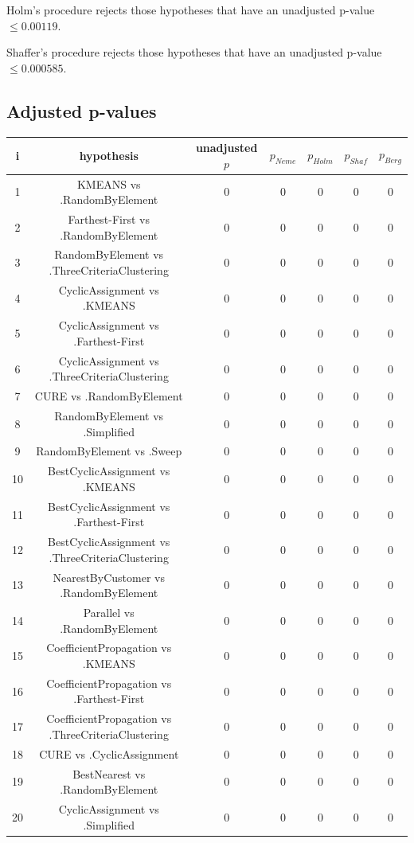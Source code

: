 \documentclass[a4paper,10pt]{article}
\begin{document}
\begin{landscape}
Holm's procedure rejects those hypotheses that have an unadjusted p-value $\le0.00119$.

Shaffer's procedure rejects those hypotheses that have an unadjusted p-value $\le0.000585$.

\pagebreak

\subsection{Adjusted p-values}

\begin{table}[!htp]
\centering\scriptsize
\begin{tabular}{ccccccc}
i&hypothesis&unadjusted $p$&$p_{Neme}$&$p_{Holm}$&$p_{Shaf}$&$p_{Berg}$\\
\hline1&KMEANS vs .RandomByElement&0&0&0&0&0\\
2&Farthest-First vs .RandomByElement&0&0&0&0&0\\
3&RandomByElement vs .ThreeCriteriaClustering&0&0&0&0&0\\
4&CyclicAssignment vs .KMEANS&0&0&0&0&0\\
5&CyclicAssignment vs .Farthest-First&0&0&0&0&0\\
6&CyclicAssignment vs .ThreeCriteriaClustering&0&0&0&0&0\\
7&CURE vs .RandomByElement&0&0&0&0&0\\
8&RandomByElement vs .Simplified&0&0&0&0&0\\
9&RandomByElement vs .Sweep&0&0&0&0&0\\
10&BestCyclicAssignment vs .KMEANS&0&0&0&0&0\\
11&BestCyclicAssignment vs .Farthest-First&0&0&0&0&0\\
12&BestCyclicAssignment vs .ThreeCriteriaClustering&0&0&0&0&0\\
13&NearestByCustomer vs .RandomByElement&0&0&0&0&0\\
14&Parallel vs .RandomByElement&0&0&0&0&0\\
15&CoefficientPropagation vs .KMEANS&0&0&0&0&0\\
16&CoefficientPropagation vs .Farthest-First&0&0&0&0&0\\
17&CoefficientPropagation vs .ThreeCriteriaClustering&0&0&0&0&0\\
18&CURE vs .CyclicAssignment&0&0&0&0&0\\
19&BestNearest vs .RandomByElement&0&0&0&0&0\\
20&CyclicAssignment vs .Simplified&0&0&0&0&0\\

\end{tabular}
\end{table}
\end{landscape}
\end{document}
